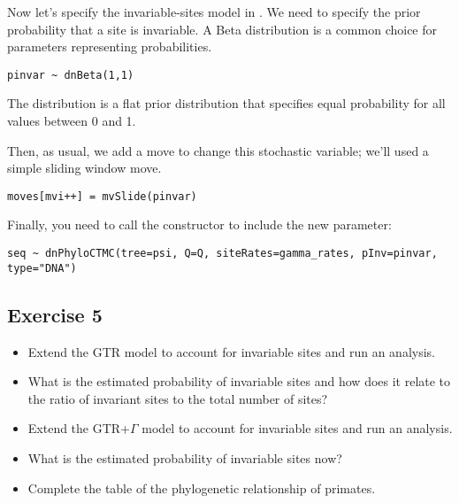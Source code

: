 Now let's specify the invariable-sites model in \RevBayes.
We need to specify the prior probability that a site is invariable.
A Beta distribution is a common choice for parameters representing probabilities.
{\tt \begin{snugshade*}
\begin{lstlisting}
pinvar ~ dnBeta(1,1)
\end{lstlisting}
\end{snugshade*}}
The  distribution is a flat prior distribution that specifies equal probability for all values between 0 and 1.

Then, as usual, we add a move to change this stochastic variable; we'll used a simple sliding window move.
{\tt \begin{snugshade*}
\begin{lstlisting}
moves[mvi++] = mvSlide(pinvar)
\end{lstlisting}
\end{snugshade*}}

Finally, you need to call the  constructor to include the new parameter:
{\tt \begin{snugshade*}
\begin{lstlisting}
seq ~ dnPhyloCTMC(tree=psi, Q=Q, siteRates=gamma_rates, pInv=pinvar, type="DNA")
\end{lstlisting}
\end{snugshade*}}

\subsection{Exercise 5}

\begin{itemize}
\item Extend the GTR model to account for invariable sites and run an analysis.
\item What is the estimated probability of invariable sites and how does it relate to the ratio of invariant sites to the total number of sites?
\item Extend the GTR+$\Gamma$ model to account for invariable sites and run an analysis.
\item What is the estimated probability of invariable sites now?
\item Complete the table of the phylogenetic relationship of primates.
\end{itemize} 




